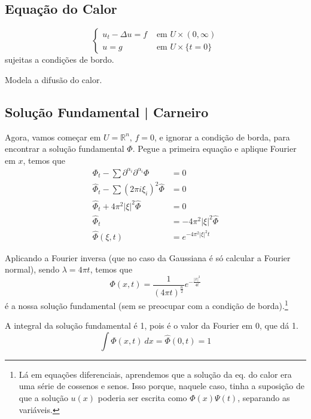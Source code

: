 \documentclass[11pt]{article}
\newcommand{\Rn}{{\mathbb{R}^n}}
\newcommand{\parentesis}[1]{\left(#1\right)}
\begin{document}
\subsection{Equação do Calor}
\begin{equation}\label{prob-calor}
	\begin{cases}
		u_t - \Delta u = f & \text{ em } U \times (0, \infty) \\
		u = g & \text{ em } U \times \{t=0\}
	\end{cases}
\end{equation} sujeitas a condições de bordo.

Modela a difusão do calor. 

\subsection*{Solução Fundamental | Carneiro}
Agora, vamos começar em \(U = \Rn\), \(f=0\), e ignorar a condição de borda, para encontrar a solução fundamental \(\Phi\). Pegue a primeira equação e aplique Fourier em \(x\), temos que 
\begin{align*}
	\Phi_t - \sum \partial^{\alpha_i}\partial^{\alpha_i}\Phi &= 0\\
	\hat{\Phi}_t - \sum (2 \pi i \xi_i)^2 \hat{\Phi} &=0 \\
	\hat{\Phi}_t + 4\pi^2 |\xi|^2 \hat{\Phi} &=0 \\
	\hat{\Phi}_t &= - 4\pi^2 |\xi|^2 \hat{\Phi} \\
	\hat{\Phi}(\xi,t) &= e^{-4\pi^2|\xi|^2 t}
\end{align*}

Aplicando a Fourier inversa (que no caso da Gaussiana é só calcular a Fourier normal), sendo \(\lambda = 4\pi t\), temos que
\begin{equation}\label{calor-fundamental}
	\Phi(x,t) = \frac{1}{\parentesis{4\pi t}^\frac{n}{2}}e^{-\frac{|x|^2}{4t}}
\end{equation} é a nossa solução fundamental (sem se preocupar com a condição de borda).\footnote{Lá em equações diferenciais, aprendemos que a solução da eq. do calor era uma série de cossenos e senos. Isso porque, naquele caso, tinha a suposição de que a solução \(u(x)\) poderia ser escrita como \(\Phi(x)\Psi(t)\), separando as variáveis.}

A integral da solução fundamental é 1, pois é o valor da Fourier em 0, que dá 1. \[\int \Phi(x,t)\ dx = \hat{\Phi}(0,t) = 1\]
\end{document}
